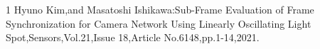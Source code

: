 \begin{雑誌論文}{1}
Hyuno Kim,and Masatoshi Ishikawa:Sub-Frame Evaluation of Frame Synchronization for Camera Network Using Linearly Oscillating Light Spot,Sensors,Vol.21,Issue 18,Article No.6148,pp.1-14,2021.

\end{雑誌論文}

